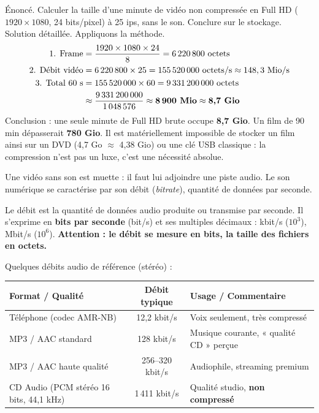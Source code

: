 \documentclass[11pt]{article}
\newcommand{\cle}[1]{{\popxbold\color{popdark}#1}}
\newcounter{popsec}
\newcounter{popsub}
\newcommand{\courssub}[1]{%
  \stepcounter{popsub}%
  \par\vspace{9pt}\noindent{\popxbold\fontsize{11.5}{13}\selectfont\color{popink}{\color{poporange}\thepopsec.\thepopsub}\hspace{6pt}#1}\par\nopagebreak\vspace{4pt}
}
\begin{document}
\begin{exoresolu}
Énoncé. Calculer la taille d'une minute de vidéo non compressée en Full HD ($1920 \times 1080$, 24 bits/pixel) à 25 ips, sans le son. Conclure sur le stockage.
\tcblower
Solution détaillée. Appliquons la méthode.
\begin{align*}
\text{1. Frame} &= \frac{1920 \times 1080 \times 24}{8} = 6\,220\,800 \text{ octets}\\
\text{2. Débit vidéo} &= 6\,220\,800 \times 25 = 155\,520\,000 \text{ octets/s} \approx 148,3 \text{ Mio/s}\\
\text{3. Total 60 s} &= 155\,520\,000 \times 60 = 9\,331\,200\,000 \text{ octets}\\
&\approx \frac{9\,331\,200\,000}{1\,048\,576} \approx \textbf{8\,900 Mio} \approx \textbf{8,7 Gio}
\end{align*}
Conclusion : une seule minute de Full HD brute occupe \textbf{8,7 Gio}. Un film de 90 min dépasserait \textbf{780 Gio}. Il est matériellement impossible de stocker un film ainsi sur un DVD (4,7 Go $\approx$ 4,38 Gio) ou une clé USB classique : la compression n'est pas un luxe, c'est une nécessité absolue.
\end{exoresolu}

\courssub{Ajouter la piste son}

Une vidéo sans son est muette : il faut lui adjoindre une \cle{piste audio}. Le son numérique se caractérise par son \cle{débit} (\emph{bitrate}), quantité de données par seconde.

\begin{definition}
Le \cle{débit} est la quantité de données audio produite ou transmise par seconde. Il s'exprime en \textbf{bits par seconde} (bit/s) et ses multiples décimaux : kbit/s ($10^3$), Mbit/s ($10^6$). \textbf{Attention : le débit se mesure en bits, la taille des fichiers en octets.}
\end{definition}

Quelques débits audio de référence (stéréo) :

\begin{center}
\begin{tabularx}{\linewidth}{|l|c|X|}
\hline
\rowcolor{popblueL} \textbf{Format / Qualité} & \textbf{Débit typique} & \textbf{Usage / Commentaire} \\
\hline
Téléphone (codec AMR-NB) & 12,2 kbit/s & Voix seulement, très compressé \\
\hline
MP3 / AAC standard & 128 kbit/s & Musique courante, « qualité CD » perçue \\
\hline
MP3 / AAC haute qualité & 256--320 kbit/s & Audiophile, streaming premium \\
\hline
CD Audio (PCM stéréo 16 bits, 44,1 kHz) & 1\,411 kbit/s & Qualité studio, \textbf{non compressé} \\
\hline
\end{tabularx}
\end{center}
\end{document}
